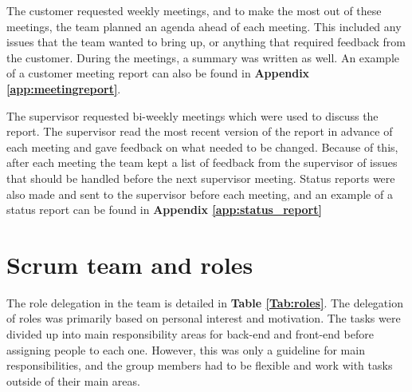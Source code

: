 The customer requested weekly meetings, and to make the most out of these meetings, the team planned an agenda ahead of each meeting. This included any issues that the team wanted to bring up, or anything that required feedback from the customer. During the meetings, a summary was written as well. An example of a customer meeting report can also be found in \textbf{Appendix \ref{app:meetingreport}}.\newline

The supervisor requested bi-weekly meetings which were used to discuss the report. The supervisor read the most recent version of the report in advance of each meeting and gave feedback on what needed to be changed. Because of this, after each meeting the team kept a list of feedback from the supervisor of issues that should be handled before the next supervisor meeting. Status reports were also made and sent to the supervisor before each meeting, and an example of a status report can be found in \textbf{Appendix \ref{app:status_report}}

\section{Scrum team and roles}
\label{sec:scrum_team_and_roles}

The role delegation in the team is detailed in \textbf{Table \ref{Tab:roles}}. The delegation of roles was primarily based on personal interest and motivation. The tasks were divided up into main responsibility areas for back-end and front-end before assigning people to each one. However, this was only a guideline for main responsibilities, and the group members had to be flexible and work with tasks outside of their main areas.

